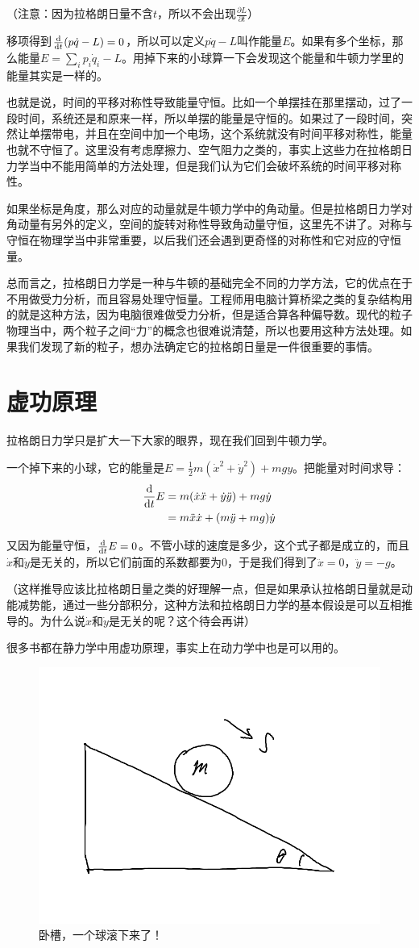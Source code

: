 （注意：因为拉格朗日量不含$t$，所以不会出现$\frac{\partial L}{\partial t}$）

移项得到$\frac{\mathop{}\!\mathrm{d}}{\mathop{}\!\mathrm{d} t}(p \dot q-L)=0$，所以可以定义$p \dot q-L$叫作能量$E$。如果有多个坐标，那么能量$E=\sum_i p_i \dot q_i-L$。用掉下来的小球算一下会发现这个能量和牛顿力学里的能量其实是一样的。

也就是说，时间的平移对称性导致能量守恒。比如一个单摆挂在那里摆动，过了一段时间，系统还是和原来一样，所以单摆的能量是守恒的。如果过了一段时间，突然让单摆带电，并且在空间中加一个电场，这个系统就没有时间平移对称性，能量也就不守恒了。这里没有考虑摩擦力、空气阻力之类的，事实上这些力在拉格朗日力学当中不能用简单的方法处理，但是我们认为它们会破坏系统的时间平移对称性。

如果坐标是角度，那么对应的动量就是牛顿力学中的角动量。但是拉格朗日力学对角动量有另外的定义，空间的旋转对称性导致角动量守恒，这里先不讲了。对称与守恒在物理学当中非常重要，以后我们还会遇到更奇怪的对称性和它对应的守恒量。

总而言之，拉格朗日力学是一种与牛顿的基础完全不同的力学方法，它的优点在于不用做受力分析，而且容易处理守恒量。工程师用电脑计算桥梁之类的复杂结构用的就是这种方法，因为电脑很难做受力分析，但是适合算各种偏导数。现代的粒子物理当中，两个粒子之间“力”的概念也很难说清楚，所以也要用这种方法处理。如果我们发现了新的粒子，想办法确定它的拉格朗日量是一件很重要的事情。
\section{虚功原理}
拉格朗日力学只是扩大一下大家的眼界，现在我们回到牛顿力学。

一个掉下来的小球，它的能量是$E=\frac{1}{2}m(\dot x^2+\dot y^2)+m g y$。把能量对时间求导：
\begin{align*}
\frac{\mathop{}\!\mathrm{d}}{\mathop{}\!\mathrm{d} t} E&=m(\dot x \ddot x+\dot y \ddot y)+m g \dot y \\
&=m \ddot x \dot x+(m \ddot y+m g) \dot y
\end{align*}

又因为能量守恒，$\frac{\mathop{}\!\mathrm{d}}{\mathop{}\!\mathrm{d} t} E=0$。不管小球的速度是多少，这个式子都是成立的，而且$\dot x$和$\dot y$是无关的，所以它们前面的系数都要为$0$，于是我们得到了$\ddot x=0$，$\ddot y=-g$。

（这样推导应该比拉格朗日量之类的好理解一点，但是如果承认拉格朗日量就是动能减势能，通过一些分部积分，这种方法和拉格朗日力学的基本假设是可以互相推导的。为什么说$\dot x$和$\dot y$是无关的呢？这个待会再讲）

很多书都在静力学中用虚功原理，事实上在动力学中也是可以用的。
\begin{figure}[htb]
\centering
\includegraphics[width=0.33\linewidth]{fig/slope-ball.png}
\caption{卧槽，一个球滚下来了！}
\label{fig-slope-ball}
\end{figure}


